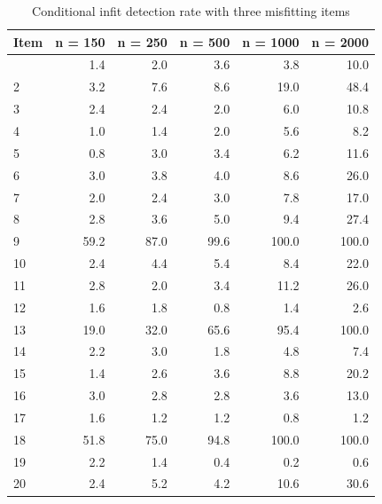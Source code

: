 \documentclass[
  letterpaper,
  DIV=11,
  numbers=noendperiod]{scrartcl}
\begin{document}
\begin{longtable}[]{@{}lrrrrr@{}}

\caption{\label{tbl-ifb3}Conditional infit detection rate with three
misfitting items}

\tabularnewline

\toprule\noalign{}
Item & n = 150 & n = 250 & n = 500 & n = 1000 & n = 2000 \\
\midrule\noalign{}
\endhead
\bottomrule\noalign{}
\endlastfoot
1 & 1.4 & 2.0 & 3.6 & 3.8 & 10.0 \\
2 & 3.2 & 7.6 & 8.6 & 19.0 & 48.4 \\
3 & 2.4 & 2.4 & 2.0 & 6.0 & 10.8 \\
4 & 1.0 & 1.4 & 2.0 & 5.6 & 8.2 \\
5 & 0.8 & 3.0 & 3.4 & 6.2 & 11.6 \\
6 & 3.0 & 3.8 & 4.0 & 8.6 & 26.0 \\
7 & 2.0 & 2.4 & 3.0 & 7.8 & 17.0 \\
8 & 2.8 & 3.6 & 5.0 & 9.4 & 27.4 \\
9 & 59.2 & 87.0 & 99.6 & 100.0 & 100.0 \\
10 & 2.4 & 4.4 & 5.4 & 8.4 & 22.0 \\
11 & 2.8 & 2.0 & 3.4 & 11.2 & 26.0 \\
12 & 1.6 & 1.8 & 0.8 & 1.4 & 2.6 \\
13 & 19.0 & 32.0 & 65.6 & 95.4 & 100.0 \\
14 & 2.2 & 3.0 & 1.8 & 4.8 & 7.4 \\
15 & 1.4 & 2.6 & 3.6 & 8.8 & 20.2 \\
16 & 3.0 & 2.8 & 2.8 & 3.6 & 13.0 \\
17 & 1.6 & 1.2 & 1.2 & 0.8 & 1.2 \\
18 & 51.8 & 75.0 & 94.8 & 100.0 & 100.0 \\
19 & 2.2 & 1.4 & 0.4 & 0.2 & 0.6 \\
20 & 2.4 & 5.2 & 4.2 & 10.6 & 30.6 \\

\end{longtable}
\end{document}
